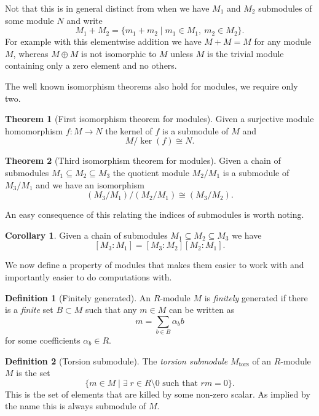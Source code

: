 \documentclass[a4paper,abstracton,bibtotoc]{scrreprt}
\theoremstyle{definition}
\newtheorem{thm}{Theorem}
\newtheorem{cor}{Corollary}
\newtheorem{defn}{Definition}
\begin{document}
Not that this is in general distinct from when we have $M_1$ and $M_2$ submodules of some module $N$ and write
\[
M_1 + M_2 = \{m_1 + m_2 \mid m_1\in M_1,\ m_2\in M_2\}.
\]
For example with this elementwise addition we have $M + M = M$ for any module $M$, whereas $M\oplus M$ is not isomorphic to $M$ unless $M$ is the trivial module containing only a zero element and no others.

The well known isomorphism theorems also hold for modules, we require only two.

\begin{thm}[First isomorphism theorem for modules]
Given a surjective module homomorphism $f\colon M \to N$ the kernel of $f$ is a submodule of $M$ and
\[
M/\ker(f) \cong N.
\]
\end{thm}

\begin{thm}[Third isomorphism theorem for modules]
Given a chain of submodules $M_1 \subseteq M_2 \subseteq M_3$ the quotient module $M_2/M_1$ is a submodule of $M_3/M_1$ and we have an isomorphism
\[
(M_3/M_1)/(M_2/M_1) \cong (M_3/M_2).
\]
\end{thm}

An easy consequence of this relating the indices of submodules is worth noting.

\begin{cor}
\label{cor:indexmult}
Given a chain of submodules $M_1 \subseteq M_2 \subseteq M_3$ we have
\[
[M_3:M_1] = [M_3:M_2][M_2:M_1].
\]
\end{cor}

\minisec{}
We now define a property of modules that makes them easier to work with and importantly easier to do computations with.

\begin{defn}[Finitely generated]
An $R$-module $M$ is \emph{finitely} generated if there is a \emph{finite} set $B\subset M$ such that any $m\in M$ can be written as
\[m = \sum_{b\in B} \alpha_b b\]
for some coefficients $\alpha_b \in R$.
\end{defn}

\begin{defn}[Torsion submodule]
The \emph{torsion submodule} $M_\text{tors}$ of an $R$-module $M$ is the set
\[
\{m\in M \mid \exists\; r \in R\setminus 0 \text{ such that } rm = 0\}.
\]
This is the set of elements that are killed by some non-zero scalar.
As implied by the name this is always submodule of $M$.
\end{defn}
\end{document}
